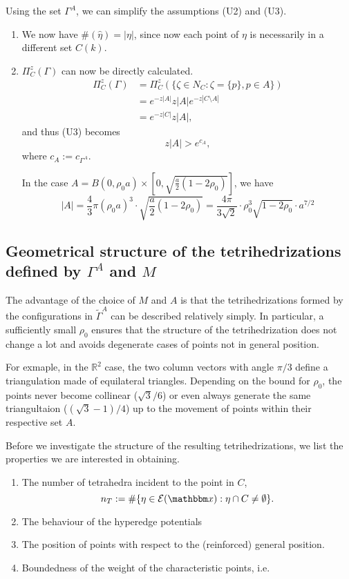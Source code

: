 \begin{remark}\label{r:UA}
	Using the set $\Gamma^A$, we can simplify the assumptions (U2) and (U3).
\begin{enumerate}[(U2)]	
\item	We now have  $\#(\hat\eta) = |\eta|$, since now each point of $\eta$ is necessarily in a different set $C(k)$.

\item $\Pi^z_C(\Gamma)$ can now be directly calculated.
	\begin{align*} 
		\Pi^z_C(\Gamma) &= \Pi^z_C(\{\zeta \in N_C: \zeta = \{p\}, p \in A\}) \\
		& = e^{-z|A|} z |A| e^{-z|C\setminus A|} \\
		& = e^{-z|C|} z |A|,
	\end{align*}
	and thus (U3) becomes
	$$z|A| > e^{c_{A}},$$
	where $c_A := c_{\Gamma^A}$.

	In the case $A = B(0,\rho_0 a)\times [0, \sqrt{\frac a2(1-2\rho_0)}]$, we have
	$$|A| = \frac 43 \pi (\rho_0 a)^3 \cdot \sqrt{\frac a2(1-2\rho_0)} = \frac {4\pi}{3\sqrt{2}}\cdot  \rho_0^3 \sqrt{1-2\rho_0} \cdot a^{7/2}$$

\end{enumerate}


\subsection{Geometrical structure of the tetrihedrizations defined by $\Gamma^A$ and $M$}
The advantage of the choice of $M$ and $A$ is that the tetrihedrizations formed by the configurations in $\tilde\Gamma^A$ can be described relatively simply. In particular, a sufficiently small $\rho_0$ ensures that the structure of the tetrihedrization does not change a lot and avoids degenerate cases of points not in general position. 

For exmaple, in the $\mathbb R^2$ case, the two column vectors with angle $\pi/3$ define a triangulation made of equilateral triangles. Depending on the bound for $\rho_0$, the points never become collinear ($\sqrt 3/6$) or even always generate the same triangultaion ($(\sqrt 3 - 1)/4$) up to the movement of points within their respective set $A$. \newline

Before we investigate the structure of the resulting tetrihedrizations, we list the properties we are interested in obtaining.
\begin{enumerate}
	\item The number of tetrahedra incident to the point in $C$,  
		$$n_T := \# \{\eta \in \mathcal E(\x): \eta \cap C \neq \emptyset\}.$$
	\item The behaviour of the hyperedge potentials
	\item The position of points with respect to the (reinforced) general position.  
	\item Boundedness of the weight of the characteristic points, i.e.
\end{enumerate}


\end{remark}
